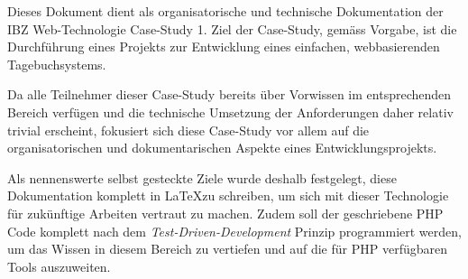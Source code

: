 \noindent
Dieses Dokument dient als organisatorische und technische Dokumentation der IBZ Web-Technologie Case-Study 1. Ziel der Case-Study, gemäss Vorgabe, ist die Durchführung eines Projekts zur Entwicklung eines einfachen, webbasierenden Tagebuchsystems.

\vspace{5mm}
\noindent
Da alle Teilnehmer dieser Case-Study bereits über Vorwissen im entsprechenden Bereich verfügen und die technische Umsetzung der Anforderungen daher relativ trivial erscheint, fokusiert sich diese Case-Study vor allem auf die organisatorischen und dokumentarischen Aspekte eines Entwicklungsprojekts.

\vspace{5mm}
\noindent
Als nennenswerte selbst gesteckte Ziele wurde deshalb festgelegt, diese Dokumentation komplett in \LaTeX zu schreiben, um sich mit dieser Technologie für zukünftige Arbeiten vertraut zu machen. Zudem soll der geschriebene PHP Code komplett nach dem \emph{Test-Driven-Development} Prinzip programmiert werden, um das Wissen in diesem Bereich zu vertiefen und auf die für PHP verfügbaren Tools auszuweiten.
